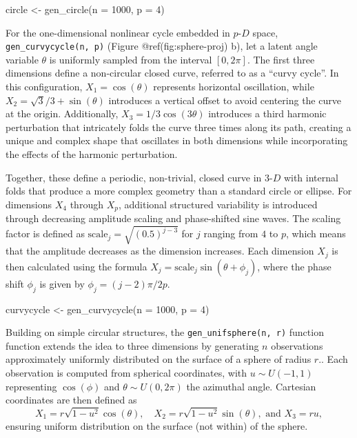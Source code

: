 \documentclass[
  11pt,
  a4paper,
]{report}
\newenvironment{Shaded}{\begin{snugshade}}{\end{snugshade}}
\newcommand{\AttributeTok}[1]{\textcolor[rgb]{0.40,0.45,0.13}{#1}}
\newcommand{\DecValTok}[1]{\textcolor[rgb]{0.68,0.00,0.00}{#1}}
\newcommand{\FunctionTok}[1]{\textcolor[rgb]{0.28,0.35,0.67}{#1}}
\newcommand{\NormalTok}[1]{\textcolor[rgb]{0.00,0.23,0.31}{#1}}
\newcommand{\OtherTok}[1]{\textcolor[rgb]{0.00,0.23,0.31}{#1}}
\begin{document}
\begin{Shaded}
\begin{Highlighting}[]
\NormalTok{circle }\OtherTok{\textless{}{-}} \FunctionTok{gen\_circle}\NormalTok{(}\AttributeTok{n =} \DecValTok{1000}\NormalTok{, }\AttributeTok{p =} \DecValTok{4}\NormalTok{)}
\end{Highlighting}
\end{Shaded}

For the one-dimensional nonlinear cycle embedded in \(p\text{-}D\)
space, \texttt{gen\_curvycycle(n,\ p)} (Figure @ref(fig:sphere-proj) b),
let a latent angle variable \(\theta\) is uniformly sampled from the
interval \([0, 2\pi]\). The first three dimensions define a non-circular
closed curve, referred to as a ``curvy cycle''. In this configuration,
\(X_1 = \cos(\theta)\) represents horizontal oscillation, while
\(X_2 = \sqrt{3}/3 + \sin(\theta)\) introduces a vertical offset to
avoid centering the curve at the origin. Additionally,
\(X_3 = 1/3\cos(3\theta)\) introduces a third harmonic perturbation that
intricately folds the curve three times along its path, creating a
unique and complex shape that oscillates in both dimensions while
incorporating the effects of the harmonic perturbation.

Together, these define a periodic, non-trivial, closed curve in
\(3\text{-}D\) with internal folds that produce a more complex geometry
than a standard circle or ellipse. For dimensions \(X_4\) through
\(X_p\), additional structured variability is introduced through
decreasing amplitude scaling and phase-shifted sine waves. The scaling
factor is defined as \(\text{scale}_j = \sqrt{(0.5)^{j-3}}\) for \(j\)
ranging from \(4\) to \(p\), which means that the amplitude decreases as
the dimension increases. Each dimension \(X_j\) is then calculated using
the formula \(X_j = \text{scale}_j\sin(\theta + \phi_j)\), where the
phase shift \(\phi_j\) is given by \(\phi_j = (j - 2)\pi/2p\).

\begin{Shaded}
\begin{Highlighting}[]
\NormalTok{curvycycle }\OtherTok{\textless{}{-}} \FunctionTok{gen\_curvycycle}\NormalTok{(}\AttributeTok{n =} \DecValTok{1000}\NormalTok{, }\AttributeTok{p =} \DecValTok{4}\NormalTok{)}
\end{Highlighting}
\end{Shaded}

Building on simple circular structures, the
\texttt{gen\_unifsphere(n,\ r)} function function extends the idea to
three dimensions by generating \(n\) observations approximately
uniformly distributed on the surface of a sphere of radius \(r\).. Each
observation is computed from spherical coordinates, with
\(u \sim U(-1, 1)\) representing \(\cos(\phi)\) and
\(\theta \sim U(0, 2\pi)\) the azimuthal angle. Cartesian coordinates
are then defined as
\[X_1 = r\sqrt{1 - u^2}\cos(\theta), \quad X_2 = r\sqrt{1 - u^2}\sin(\theta),\text{ and }X_3 = ru,\]
ensuring uniform distribution on the surface (not within) of the sphere.
\end{document}

